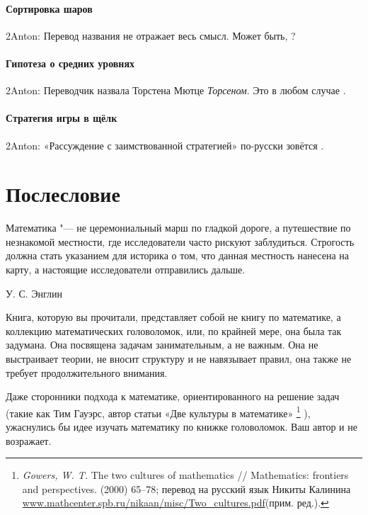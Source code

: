 \documentclass[twoside]{book}
\begin{document}
\subsubsection{Сортировка шаров}
2Anton: Перевод названия не отражает весь смысл.  
Может быть, ?

\subsubsection{Гипотеза о средних уровнях}
2Anton: Переводчик назвала Торстена Мютце \emph{Торсеном}.
Это в любом случае .

\subsubsection{Стратегия игры в щёлк}
2Anton: «Рассуждение с заимствованной стратегией» по-русски зовётся .



\chapter{Послесловие}

\setlength{\epigraphwidth}{.6\textwidth}
\epigraph{Математика "--- не церемониальный марш по гладкой дороге, а путешествие по незнакомой местности, где исследователи часто рискуют заблудиться.
Строгость должна стать указанием для историка о том, что данная местность нанесена на карту, а настоящие исследователи отправились дальше.\vspace{1ex}}{У. С. Энглин
}

Книга, которую  вы прочитали, представляет собой не книгу по математике, а коллекцию математических головоломок, или, по крайней мере, она была так задумана.
Она посвящена задачам занимательным, а не важным.
Она не выстраивает теории, не вносит структуру и не навязывает правил, она также не требует продолжительного внимания.

Даже сторонники подхода к математике, ориентированного на решение задач (такие как Тим Гауэрс, автор статьи «Две культуры в математике»%
\footnote{\emph{Gowers, W. T.} The two cultures of mathematics /\!/ {Mathematics: frontiers and per\-spec\-tives.} (2000) 65--78; перевод на русский язык Никиты Калинина \href{http://www.mathcenter.spb.ru/nikaan/misc/Two_cultures.pdf}{\url{www.mathcenter.spb.ru/nikaan/misc/Two_cultures.pdf}}(прим. ред.).} ),
ужаснулись бы идее изучать математику по книжке головоломок.
Ваш автор и не возражает.
\end{document}
